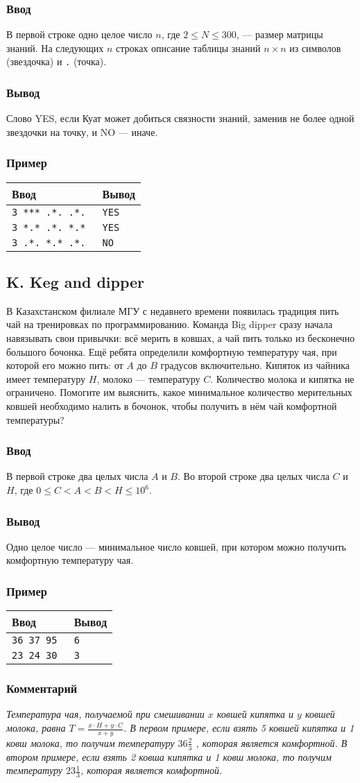 \documentclass[10pt, a4paper]{article}
\newcommand{\informat}[1]
{
	\subsubsection*{Ввод} #1
}
\newcommand{\outformat}[1]
{
	\subsubsection*{Вывод} #1
}
\newcommand{\examplee}[4]
{
	\subsubsection*{Пример}
	\noindent
	\begin{center}
	\begin{tabularx}{\linewidth}{|X|X|}
	\hline
	Ввод 	& Вывод  	\\
	\hline
	{\tt #1} & {\tt #2}	\\
	\hline
	{\tt #3} & {\tt #4}	\\
	\hline
	\end{tabularx}
	\end{center}
}
\newcommand{\exampleee}[6]
{
	\subsubsection*{Пример}
	\noindent
	\begin{center}
	\begin{tabularx}{\linewidth}{|X|X|}
	\hline
	Ввод 	& Вывод  	\\
	\hline
	{\tt #1} & {\tt #2}	\\
	\hline
	{\tt #3} & {\tt #4}	\\
	\hline
	{\tt #5} & {\tt #6}	\\
	\hline
	\end{tabularx}
	\end{center}
}
\newcommand{\excomm}[1]
{
	\subsubsection*{Комментарий}
	\textit{#1}
}
\begin{document}
\informat{В первой строке одно целое число $n$, где $2 \le N \le 300$, --- размер матрицы знаний. \newline
На следующих $n$ строках описание таблицы знаний $n \times n$ из символов {\tt *} (звездочка) и {\tt .} (точка).}

\outformat{Слово YES, если Куат может добиться связности знаний, заменив не более одной звездочки на точку, и NO --- иначе.}

\exampleee
{3 \newline
*** \newline
.*. \newline
.*.
}{YES}
{3 \newline
*.* \newline
.*. \newline
*.*
}{YES}
{3 \newline
.*. \newline
*.* \newline
.*.
}{NO}



\subsection*{K. Keg and dipper}

В Казахстанском филиале МГУ с недавнего времени появилась традиция пить чай на тренировках по программированию. Команда Big dipper сразу начала навязывать свои привычки: всё мерить в ковшах, а чай пить только из бесконечно большого бочонка. Ещё ребята определили комфортную температуру чая, при которой его можно пить: от $A$ до $B$ градусов включительно. Кипяток из чайника имеет температуру $H$, молоко --- температуру $C$. Количество молока и кипятка не ограничено. Помогите им выяснить, какое минимальное количество мерительных ковшей необходимо налить в бочонок, чтобы получить в нём чай комфортной температуры?

\informat{В первой строке два целых числа $A$ и $B$. \newline
Во второй строке два целых числа $C$ и $H$, где $0 \le C < A < B < H \le 10^6$.}

\outformat{Одно целое число --- минимальное число ковшей, при котором можно получить комфортную температуру чая.}

\examplee
{36 37 \newline
25 95}{6}
{23 24 \newline
20 30
}{3}

\excomm{Температура чая, получаемой при смешивании $x$ ковшей кипятка и $y$ ковшей молока, равна $T = \frac{x \cdot H + y \cdot C}{x + y}$. \newline
В первом примере, если взять 5 ковшей кипятка и 1 ковш молока, то получим температуру $36 \frac23$ , которая является комфортной. \newline В втором примере, если взять 2 ковша кипятка и 1 ковш молока, то получим температуру $23 \frac13$, которая является комфортной.}
\end{document}
